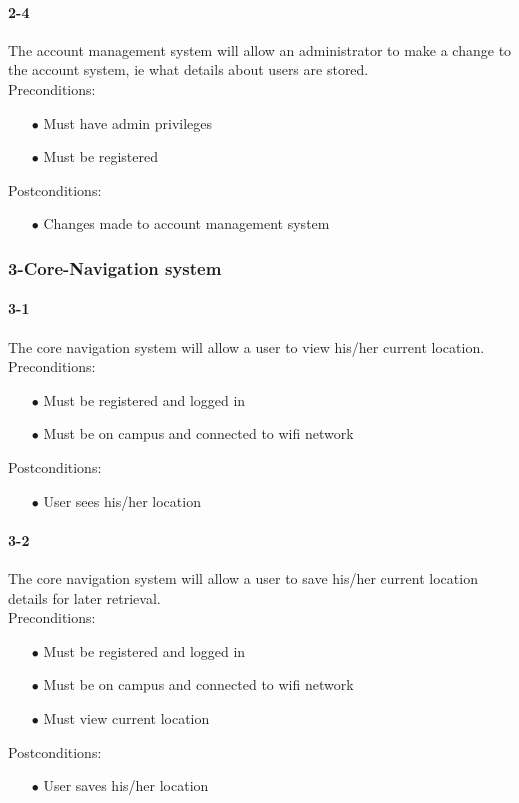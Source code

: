 \documentclass[a4paper,12pt]{article}
\begin{document}
\paragraph{2-4}
The account management system will allow an administrator to make a change to the account system, ie what details about users are stored.\\
Preconditions:
\begin{itemize}
	\item[$\bullet$] Must have admin privileges
	\item[$\bullet$] Must be registered
\end{itemize}
Postconditions:
\begin{itemize}
	\item[$\bullet$] Changes made to account management system
\end{itemize}
\subsubsection{3-Core-Navigation system}
\paragraph{3-1}
The core navigation system will allow a user to view his/her current location.\\
Preconditions:
\begin{itemize}
	\item[$\bullet$] Must be registered and logged in
	\item[$\bullet$] Must be on campus and connected to wifi network
\end{itemize}
Postconditions:
\begin{itemize}
	\item[$\bullet$] User sees his/her location
\end{itemize}
\paragraph{3-2}
The core navigation system will allow a user to save his/her current location details for later retrieval.\\
Preconditions:
\begin{itemize}
	\item[$\bullet$] Must be registered and logged in
	\item[$\bullet$] Must be on campus and connected to wifi network
	\item[$\bullet$] Must view current location
\end{itemize}
Postconditions:
\begin{itemize}
	\item[$\bullet$] User saves his/her location
\end{itemize}
\end{document}
